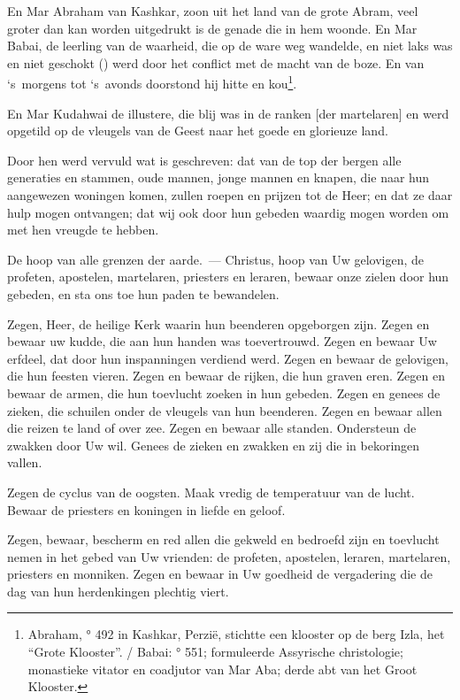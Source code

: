 \documentclass[12pt,twoside,a5paper]{article}
\begin{document}
\begin{halfparskip}
  En Mar Abraham van Kashkar, zoon uit het land van de grote Abram, veel groter dan kan worden uitgedrukt is de genade die in hem woonde. En Mar Babai, de leerling van de waarheid, die op de ware weg wandelde, en niet laks was en niet geschokt () werd door het conflict met de macht van de boze. En van `s~morgens tot `s~avonds doorstond hij hitte en kou\footnote{Abraham, ° 492 in Kashkar, Perzië, stichtte een klooster op de berg Izla, het ``Grote Klooster''. / Babai: ° 551; formuleerde Assyrische christologie; monastieke vitator en coadjutor van Mar Aba; derde abt van het Groot Klooster.}.

  En Mar Kudahwai de illustere, die blij was in de ranken [der martelaren] en werd opgetild op de vleugels van de Geest naar het goede en glorieuze land.

  Door hen werd vervuld wat is geschreven: dat van de top der bergen alle generaties en stammen, oude mannen, jonge mannen en knapen, die naar hun aangewezen woningen komen, zullen roepen en prijzen tot de Heer; en dat ze daar hulp mogen ontvangen; dat wij ook door hun gebeden waardig mogen worden om met hen vreugde te hebben.

  De hoop van alle grenzen der aarde.~--- Christus, hoop van Uw gelovigen, de profeten, apostelen, martelaren, priesters en leraren, bewaar onze zielen door hun gebeden, en sta ons toe hun paden te bewandelen.

  Zegen, Heer, de heilige Kerk waarin hun beenderen opgeborgen zijn. Zegen en bewaar uw kudde, die aan hun handen was toevertrouwd. Zegen en bewaar Uw erfdeel, dat door hun inspanningen verdiend werd. Zegen en bewaar de gelovigen, die hun feesten vieren. Zegen en bewaar de rijken, die hun graven eren. Zegen en bewaar de armen, die hun toevlucht zoeken in hun gebeden. Zegen en genees de zieken, die schuilen onder de vleugels van hun beenderen. Zegen en bewaar allen die reizen te land of over zee. Zegen en bewaar alle standen. Ondersteun de zwakken door Uw wil. Genees de zieken en zwakken en zij die in bekoringen vallen.

  Zegen de cyclus van de oogsten. Maak vredig de temperatuur van de lucht. Bewaar de priesters en koningen in liefde en geloof.

  Zegen, bewaar, bescherm en red allen die gekweld en bedroefd zijn en toevlucht nemen in het gebed van Uw vrienden: de profeten, apostelen, leraren, martelaren, priesters en monniken. Zegen en bewaar in Uw goedheid de vergadering die de dag van hun herdenkingen plechtig viert.
\end{halfparskip}
\end{document}
